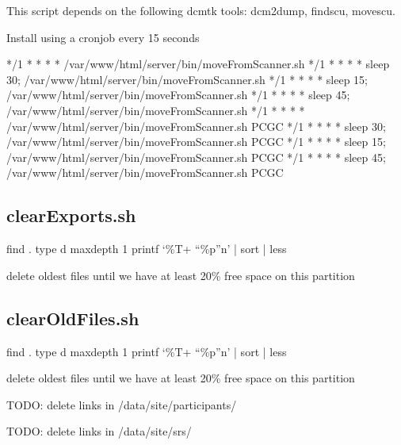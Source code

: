 \documentclass[letterpaper,10pt,english]{sphinxmanual}
\begin{document}
\sphinxAtStartPar
This script depends on the following dcmtk tools: dcm2dump, findscu, movescu.

\sphinxAtStartPar
Install using a cron\sphinxhyphen{}job every 15 seconds

\begin{sphinxVerbatim}[commandchars=\\\{\}]
*/1 * * * * /var/www/html/server/bin/moveFromScanner.sh
*/1 * * * * sleep 30; /var/www/html/server/bin/moveFromScanner.sh
*/1 * * * * sleep 15; /var/www/html/server/bin/moveFromScanner.sh
*/1 * * * * sleep 45; /var/www/html/server/bin/moveFromScanner.sh
*/1 * * * * /var/www/html/server/bin/moveFromScanner.sh PCGC
*/1 * * * * sleep 30; /var/www/html/server/bin/moveFromScanner.sh PCGC
*/1 * * * * sleep 15; /var/www/html/server/bin/moveFromScanner.sh PCGC
*/1 * * * * sleep 45; /var/www/html/server/bin/moveFromScanner.sh PCGC
\end{sphinxVerbatim}

\sphinxstepscope


\subsection{clearExports.sh}
\label{\detokenize{Architecture/scripts/clearExports:clearexports-sh}}\label{\detokenize{Architecture/scripts/clearExports::doc}}
\sphinxAtStartPar
find . \sphinxhyphen{}type d \sphinxhyphen{}maxdepth 1 \sphinxhyphen{}printf ‘\%T+ “\%p”n’ | sort | less

\sphinxAtStartPar
delete oldest files until we have at least 20\% free space on this partition

\sphinxstepscope


\subsection{clearOldFiles.sh}
\label{\detokenize{Architecture/scripts/clearOldFiles:clearoldfiles-sh}}\label{\detokenize{Architecture/scripts/clearOldFiles::doc}}
\sphinxAtStartPar
find . \sphinxhyphen{}type d \sphinxhyphen{}maxdepth 1 \sphinxhyphen{}printf ‘\%T+ “\%p”n’ | sort | less

\sphinxAtStartPar
delete oldest files until we have at least 20\% free space on this partition

\sphinxAtStartPar
TODO: delete links in /data/site/participants/

\sphinxAtStartPar
TODO: delete links in /data/site/srs/

\sphinxstepscope
\end{document}
